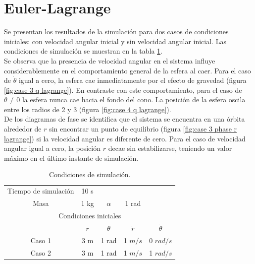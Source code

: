 \documentclass[12pt,letterpaper]{article}
\begin{document}
\section*{Euler-Lagrange}

Se presentan los resultados de la simulación para dos casos de condiciones iniciales: con velocidad angular inicial y sin velocidad angular inicial.
Las condiciones de simulación se muestran en la
tabla \ref{table: initial conditions}. \\

Se observa que la presencia de velocidad angular en el sistema influye considerablemente en el comportamiento general de la esfera al caer.
Para el caso de $\dot \theta$ igual a cero, la esfera cae inmediatamente por el efecto de gravedad (figura \ref{fig:case 3 q lagrange}).
En contraste con este comportamiento, para el caso de $\dot \theta \neq 0$ la esfera nunca cae hacia el fondo del cono.
La posición de la esfera oscila entre los radios de 2 y 3 (figura \ref{fig:case 4 q lagrange}).\\

De los diagramas de fase se identifica que el sistema se encuentra en una órbita alrededor de $r$ sin encontrar un punto de equilibrio (figura \ref{fig:case 3 phase r lagrange}) si la velocidad angular es diferente de cero. 
Para el caso de velocidad angular igual a cero, la posición $r$ decae sin estabilizarse, teniendo un valor máximo en el último instante de simulación.

\begin{table}[h]
\begin{center}
\centering
\begin{tabular}{ccccc}
\hline
Tiempo de simulación & 10 s & & &\\
Masa & 1 kg & $\alpha$ & 1 rad  & \\
\hline
\multicolumn{5}{c}{Condiciones iniciales}\\
 & $r$ & $\theta$ & $\dot r$ & $\dot \theta$\\
Caso 1 & 3 m & 1 rad & 1 $m/s$ & 0 $rad/s$\\
Caso 2 & 3 m & 1 rad & 1 $m/s$ & 1 $rad/s$\\
\hline
\end{tabular}
\end{center}
 \caption{Condiciones de simulación.}
 \label{table: initial conditions}
\end{table}


\end{document}
